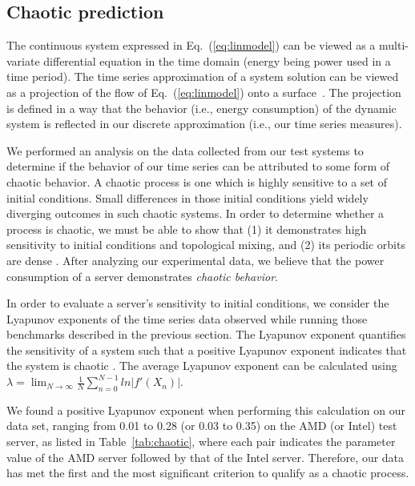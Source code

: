 \documentclass[prodmode,acmtaco,pdftex]{acmsmall}
\newcommand{\equationname}{Eq.}
\begin{document}
\subsection{Chaotic prediction}
\label{sec:chaospredict}
The continuous system expressed in \equationname~(\ref{eq:linmodel}) can
be viewed as a multi-variate differential equation in the time domain
(energy being power used in a time period).  The time series
approximation of a system solution can be viewed as a projection of
the flow of \equationname~(\ref{eq:linmodel}) onto a surface~\cite{Liu2010}.
The projection is defined in a way that the behavior (i.e., energy consumption)
of the dynamic system is reflected in our discrete approximation
(i.e., our time series measures).

We performed an analysis on the data collected from our test systems to
determine if the behavior of our time series can be attributed to some
form of chaotic behavior.  A chaotic process is one which is highly
sensitive to a set of initial conditions.  Small differences in those
initial conditions yield widely diverging outcomes in such chaotic
systems.  In order to determine whether a process is chaotic, we must be
able to show that (1) it demonstrates high sensitivity to initial
conditions and topological mixing, and (2) its periodic orbits are dense
\cite{Sprott2003}.  After analyzing our experimental data, we believe
that the power consumption of a server demonstrates \textit{chaotic behavior}.

In order to evaluate a server's sensitivity to initial conditions, we
consider the Lyapunov exponents of the time series data observed while
running those benchmarks described in the previous section.  The
Lyapunov exponent quantifies the sensitivity of a system such that a
positive Lyapunov exponent indicates that the system is chaotic
\cite{Sprott2003}.  The average Lyapunov exponent can be calculated using
$\lambda = \lim_{N\to\infty}\frac{1}{N}\sum_{n=0}^{N-1}ln|f'(X_n)|$.

We found a positive Lyapunov exponent when performing this calculation
on our data set, ranging from 0.01 to 0.28 (or 0.03 to 0.35) on the AMD
(or Intel) test server, as listed in Table~\ref{tab:chaotic}, where
each pair indicates the parameter value of the AMD server followed by
that of the Intel server.  Therefore, our data has met the first and
the most significant criterion to qualify as a chaotic process.
\end{document}
